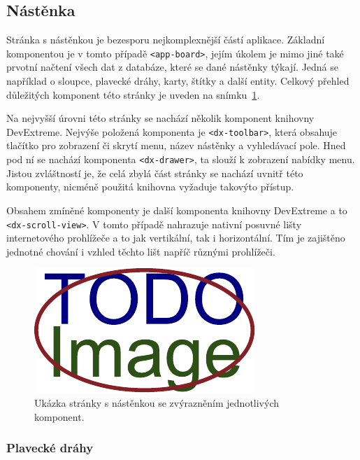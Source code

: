 \subsection{Nástěnka}
Stránka s nástěnkou je bezesporu nejkomplexnější částí aplikace. Základní komponentou je v tomto případě \texttt{<app-board>}, jejím úkolem je mimo jiné také prvotní načtení všech dat z databáze, které se dané nástěnky týkají. Jedná se například o sloupce, plavecké dráhy, karty, štítky a další entity. Celkový přehled důležitých komponent této stránky je uveden na snímku~\ref{img:comp-board-scheme}.

Na nejvyšší úrovni této stránky se nachází několik komponent knihovny DevExtreme. Nejvýše položená komponenta je \texttt{<dx-toolbar>}, která obsahuje tlačítko pro zobrazení či skrytí menu, název nástěnky a vyhledávací pole. Hned pod ní se nachází komponenta \texttt{<dx-drawer>}, ta slouží k zobrazení nabídky menu. Jistou zvláštností je, že celá zbylá část stránky se nachází uvnitř této komponenty, nicméně použitá knihovna vyžaduje takovýto přístup.

Obsahem zmíněné komponenty je další komponenta knihovny DevExtreme a to \texttt{<dx-scroll-view>}. V tomto případě nahrazuje nativní posuvné lišty internetového prohlížeče a to jak vertikální, tak i horizontální. Tím je zajištěno jednotné chování i vzhled těchto lišt napříč různými prohlížeči.

\begin{figure}[H]
	\centering
	\label{img:comp-board-scheme}
	\includegraphics[width=\textwidth]{obrazky-figures/placeholder.pdf}
	\caption{Ukázka stránky s nástěnkou se zvýrazněním jednotlivých komponent.}
\end{figure}

\subsubsection*{Plavecké dráhy}

